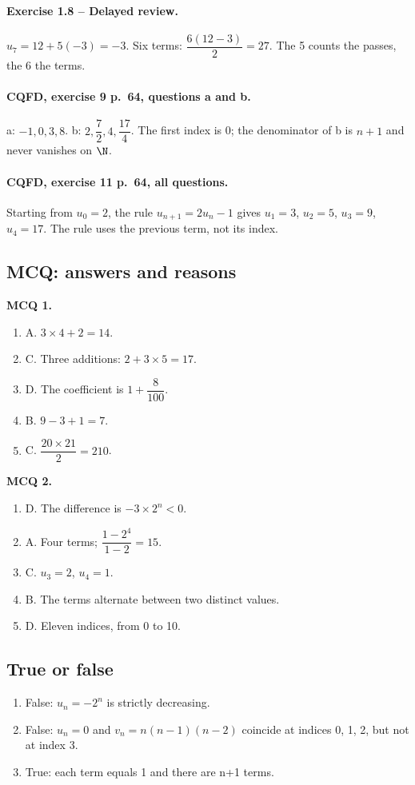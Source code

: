 \paragraph{Exercise 1.8 -- Delayed review.} $u_7=12+5(-3)=-3$. Six terms: $\dfrac{6(12-3)}{2}=27$. The 5 counts the passes, the 6 the terms.
\paragraph{CQFD, exercise 9 p.~64, questions a and b.} a: $-1,0,3,8$. b: $2,\dfrac72,4,\dfrac{17}4$. The first index is 0; the denominator of b is $n+1$ and never vanishes on $\N$.
\paragraph{CQFD, exercise 11 p.~64, all questions.} Starting from $u_0=2$, the rule $u_{n+1}=2u_n-1$ gives $u_1=3$, $u_2=5$, $u_3=9$, $u_4=17$. The rule uses the previous term, not its index.
\subsection*{MCQ: answers and reasons}
\textbf{MCQ 1.}
\begin{enumerate}
\item A. $3\times4+2=14$.
\item C. Three additions: $2+3\times5=17$.
\item D. The coefficient is $1+\dfrac{8}{100}$.
\item B. $9-3+1=7$.
\item C. $\dfrac{20\times 21}{2}=210$.
\end{enumerate}
\textbf{MCQ 2.}
\begin{enumerate}
\item D. The difference is $-3\times2^n<0$.
\item A. Four terms; $\dfrac{1-2^4}{1-2}=15$.
\item C. $u_3=2$, $u_4=1$.
\item B. The terms alternate between two distinct values.
\item D. Eleven indices, from 0 to 10.
\end{enumerate}
\subsection*{True or false}
\begin{enumerate}
\item False: $u_n=-2^n$ is strictly decreasing.
\item False: $u_n=0$ and $v_n=n(n-1)(n-2)$ coincide at indices 0, 1, 2, but not at index 3.
\item True: each term equals 1 and there are n+1 terms.
\end{enumerate}
